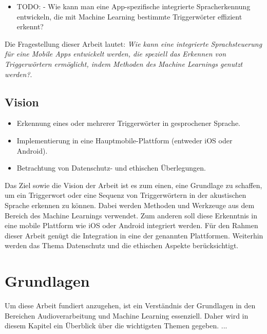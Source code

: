 \documentclass[11pt,a4paper]{article}
\begin{document}
\begin{itemize}
\item TODO: - Wie kann man eine App-spezifische integrierte Spracherkennung entwickeln, die mit Machine Learning 
bestimmte Triggerwörter effizient erkennt?
\end{itemize}

\noindent
Die Fragestellung dieser Arbeit lautet: \textit{Wie kann eine integrierte Sprachsteuerung für eine
	Mobile Apps entwickelt werden, die speziell das Erkennen von Triggerwörtern ermöglicht, indem
	Methoden des Machine Learnings genutzt werden?}.

\subsection{Vision}

\begin{itemize}
    \item Erkennung eines oder mehrerer Triggerwörter in gesprochener Sprache.
    \item Implementierung in eine Hauptmobile-Plattform (entweder iOS oder Android).
    \item Betrachtung von Datenschutz- und ethischen Überlegungen.
\end{itemize}

Das Ziel sowie die Vision der Arbeit ist es zum einen, eine Grundlage zu schaffen, um ein
Triggerwort oder eine Sequenz von Triggerwörtern in der akustischen Sprache erkennen zu können.
Dabei werden Methoden und Werkzeuge aus dem Bereich des Machine Learnings verwendet. Zum anderen
soll diese Erkenntnis in eine mobile Plattform wie iOS oder Android integriert werden. Für den
Rahmen dieser Arbeit genügt die Integration in eine der genannten Plattformen. Weiterhin
werden das Thema Datenschutz und die ethischen Aspekte berücksichtigt.

\newpage \section{Grundlagen}
Um diese Arbeit fundiert anzugehen, ist ein Verständnis der Grundlagen in den Bereichen
Audioverarbeitung und Machine Learning essenziell. Daher wird in diesem Kapitel ein Überblick
über die wichtigsten Themen gegeben. ...
\end{document}
